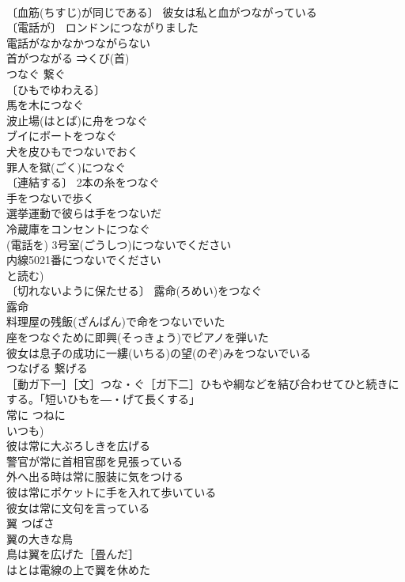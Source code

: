 \documentclass[8pt]{extreport}
\begin{document}
\begin{CJK}{UTF8}{min}
\\	〔血筋(ちすじ)が同じである〕 彼女は私と血がつながっている 
\\	〔電話が〕 ロンドンにつながりました 
\\	電話がなかなかつながらない 
\\	首がつながる ⇒くび(首)
\\	つなぐ	繋ぐ	
\\	〔ひもでゆわえる〕
\\	馬を木につなぐ 
\\	波止場(はとば)に舟をつなぐ 
\\	ブイにボートをつなぐ 
\\	犬を皮ひもでつないでおく 
\\	罪人を獄(ごく)につなぐ 
\\	〔連結する〕 2本の糸をつなぐ 
\\	手をつないで歩く 
\\	選挙運動で彼らは手をつないだ 
\\	冷蔵庫をコンセントにつなぐ 
\\	(電話を) 3号室(ごうしつ)につないでください 
\\	内線5021番につないでください 
\\	と読む) 
\\	〔切れないように保たせる〕 露命(ろめい)をつなぐ 
\\	露命　
\\	料理屋の残飯(ざんぱん)で命をつないでいた 
\\	座をつなぐために即興(そっきょう)でピアノを弾いた 
\\	彼女は息子の成功に一縷(いちる)の望(のぞ)みをつないでいる 
\\	つなげる	繋げる	
\\	［動ガ下一］［文］つな・ぐ［ガ下二］ひもや綱などを結び合わせてひと続きにする。「短いひもを―・げて長くする」
\\	常に	つねに	
\\	いつも) 
\\	彼は常に大ぶろしきを広げる 
\\	警官が常に首相官邸を見張っている 
\\	外へ出る時は常に服装に気をつける 
\\	彼は常にポケットに手を入れて歩いている 
\\	彼女は常に文句を言っている 
\\	翼	つばさ	
\\	翼の大きな鳥 
\\	鳥は翼を広げた［畳んだ］ 
\\	はとは電線の上で翼を休めた 

\end{CJK}
\end{document}

